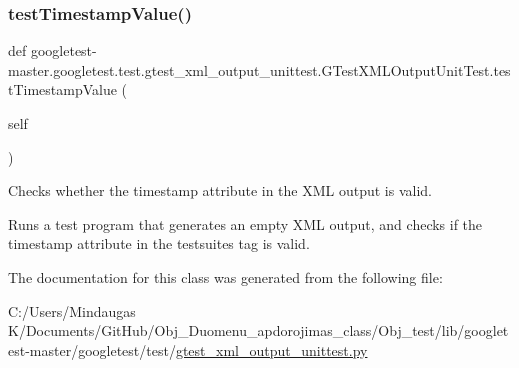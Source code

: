 \subsubsection{\texorpdfstring{testTimestampValue()}{testTimestampValue()}}
{\footnotesize\ttfamily def googletest-\/master.\+googletest.\+test.\+gtest\+\_\+xml\+\_\+output\+\_\+unittest.\+G\+Test\+X\+M\+L\+Output\+Unit\+Test.\+test\+Timestamp\+Value (\begin{DoxyParamCaption}\item[{}]{self }\end{DoxyParamCaption})}

\begin{DoxyVerb}Checks whether the timestamp attribute in the XML output is valid.

Runs a test program that generates an empty XML output, and checks if
the timestamp attribute in the testsuites tag is valid.
\end{DoxyVerb}
 

The documentation for this class was generated from the following file\+:\begin{DoxyCompactItemize}
\item 
C\+:/\+Users/\+Mindaugas K/\+Documents/\+Git\+Hub/\+Obj\+\_\+\+Duomenu\+\_\+apdorojimas\+\_\+class/\+Obj\+\_\+test/lib/googletest-\/master/googletest/test/\mbox{\hyperlink{_obj__test_2lib_2googletest-master_2googletest_2test_2gtest__xml__output__unittest_8py}{gtest\+\_\+xml\+\_\+output\+\_\+unittest.\+py}}\end{DoxyCompactItemize}
